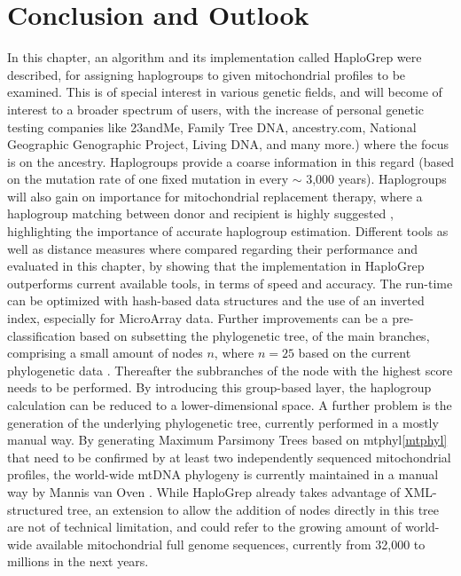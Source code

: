 \section{Conclusion and Outlook}\label{hg:outlook}
In this chapter, an algorithm and its implementation called HaploGrep were described, for assigning haplogroups to given mitochondrial profiles to be examined. This is of special interest in various genetic fields, and will become of interest to a broader spectrum of users, with the increase of personal genetic testing companies like 23andMe, Family Tree DNA, ancestry.com, National Geographic Genographic Project, Living DNA, and many more.) where the focus is on the ancestry. Haplogroups provide a coarse information in this regard (based on the mutation rate of one fixed mutation in every $\sim$ 3,000 years). Haplogroups will also gain on importance for mitochondrial replacement therapy, where a haplogroup matching between donor and recipient is highly suggested \cite{Royrvik2016}, highlighting the importance of accurate haplogroup estimation. Different tools as well as distance measures where compared regarding their performance and evaluated in this chapter, by showing that the implementation in HaploGrep outperforms current available tools, in terms of speed and accuracy. The run-time can be optimized with hash-based data structures and the use of an inverted index, especially for MicroArray data. Further improvements can be a pre-classification based on subsetting the phylogenetic tree, of the main branches, comprising a small amount of nodes $n$, where $n = 25$ based on the current phylogenetic data \cite{VanOven2015}. Thereafter the subbranches of the node with the highest score needs to be performed. By introducing this group-based layer, the haplogroup calculation can be reduced to a lower-dimensional space. A further problem is the generation of the underlying phylogenetic tree, currently performed in a mostly manual way. By generating Maximum Parsimony Trees based on mtphyl\ref{mtphyl} that need to be confirmed by at least two independently sequenced mitochondrial profiles, the world-wide mtDNA phylogeny is currently maintained in a manual way by Mannis van Oven \cite{VanOven2015}. While HaploGrep already takes advantage of XML-structured tree, an extension to allow the addition of nodes directly in this tree are not of technical limitation, and could refer to the growing amount of world-wide available mitochondrial full genome sequences, currently from 32,000 to millions in the next years.
